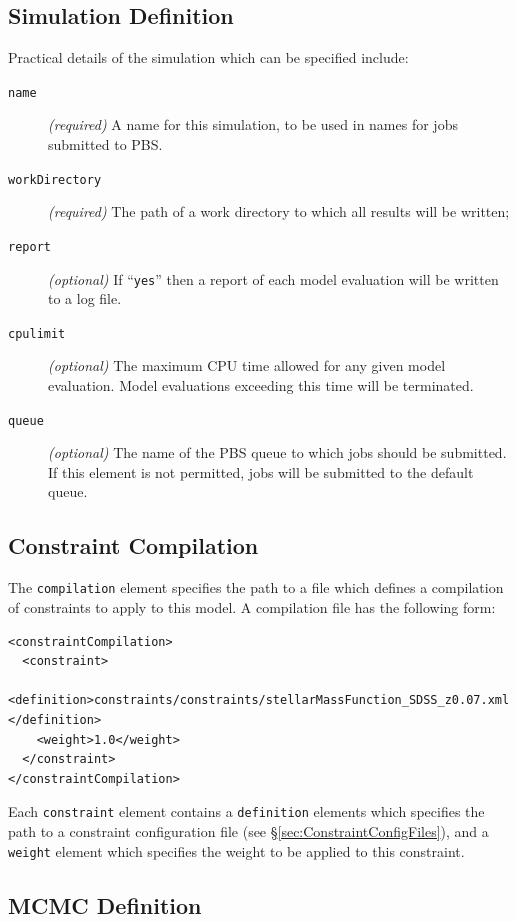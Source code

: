 \subsection{Simulation Definition}

Practical details of the simulation which can be specified include:
\begin{description}
 \item [{\tt name}] \emph{(required)} A name for this simulation, to be used in names for jobs submitted to PBS.
 \item [{\tt workDirectory}] \emph{(required)} The path of a work directory to which all results will be written;
 \item [{\tt report}] \emph{(optional)} If ``{\tt yes}'' then a report of each model evaluation will be written to a log file.
 \item [{\tt cpulimit}] \emph{(optional)} The maximum CPU time allowed for any given model evaluation. Model evaluations exceeding this time will be terminated.
 \item [{\tt queue}] \emph{(optional)} The name of the PBS queue to which jobs should be submitted. If this element is not permitted, jobs will be submitted to the default queue.
\end{description}

\subsection{Constraint Compilation}

The {\tt compilation} element specifies the path to a file which defines a compilation of constraints to apply to this model. A compilation file has the following form:
\begin{verbatim}
<constraintCompilation>
  <constraint>
    <definition>constraints/constraints/stellarMassFunction_SDSS_z0.07.xml
</definition>
    <weight>1.0</weight>
  </constraint>
</constraintCompilation>
\end{verbatim}
Each {\tt constraint} element contains a {\tt definition} elements which specifies the path to a constraint configuration file (see \S\ref{sec:ConstraintConfigFiles}), and a {\tt weight} element which specifies the weight to be applied to this constraint.

\subsection{MCMC Definition}

